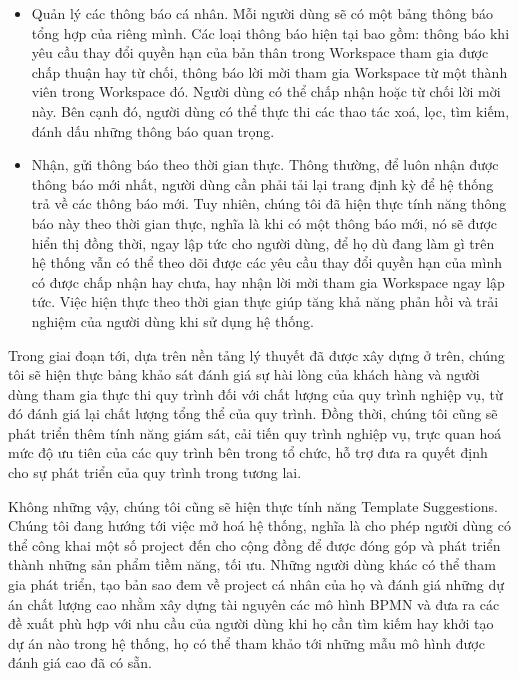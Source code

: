 \begin{itemize}
    \item Quản lý các thông báo cá nhân. Mỗi người dùng sẽ có một bảng thông báo tổng hợp
          của riêng mình. Các loại thông báo hiện tại bao gồm: thông báo khi yêu cầu thay đổi quyền hạn của bản thân trong
          Workspace tham gia được chấp thuận hay từ chối, thông báo lời mời tham gia
          Workspace từ một thành viên trong Workspace đó. Người dùng có thể chấp nhận
          hoặc từ chối lời mời này. Bên cạnh đó, người dùng có thể thực thi các thao tác
          xoá, lọc, tìm kiếm, đánh dấu những thông báo quan trọng.
    \item Nhận, gửi thông báo theo thời gian thực. Thông thường, để luôn nhận được thông
          báo mới nhất, người dùng cần phải tải lại trang định kỳ để hệ thống trả về các
          thông báo mới. Tuy nhiên, chúng tôi đã hiện thực tính năng thông báo này
          theo thời gian thực, nghĩa là khi có một thông báo mới, nó sẽ được hiển thị
          đồng thời, ngay lập tức cho người dùng, để họ dù đang làm gì trên hệ thống vẫn
          có thể theo dõi được các yêu cầu thay đổi quyền hạn của mình có được chấp nhận hay chưa, hay nhận
          lời mời tham gia Workspace ngay lập tức. Việc hiện thực theo thời gian thực
          giúp tăng khả năng phản hồi và trải nghiệm của người dùng khi sử dụng hệ thống.
\end{itemize}
\par
Trong giai đoạn tới, dựa trên nền tảng lý thuyết đã được xây dựng ở trên, chúng tôi
sẽ hiện thực bảng khảo sát đánh giá sự hài lòng của khách hàng và người dùng tham gia
thực thi quy trình đối với chất lượng của quy trình nghiệp vụ, từ đó đánh giá lại chất
lượng tổng thể của quy trình. Đồng thời, chúng tôi cũng sẽ phát triển thêm tính năng
giám sát, cải tiến quy trình nghiệp vụ, trực quan hoá mức độ ưu tiên của các quy trình
bên trong tổ chức, hỗ trợ đưa ra quyết định cho sự phát triển của quy trình trong tương lai.
\par
Không những vậy, chúng tôi cũng sẽ hiện thực tính năng Template Suggestions. 
Chúng tôi đang hướng tới việc mở hoá hệ thống, nghĩa là cho phép người dùng có thể 
công khai một số project đến cho cộng đồng để được đóng góp và phát triển thành 
những sản phẩm tiềm năng, tối ưu. Những người dùng khác có thể tham gia phát triển, 
tạo bản sao đem về project cá nhân của họ và đánh giá những dự án chất lượng cao 
nhằm xây dựng tài nguyên các mô hình BPMN và đưa ra các đề xuất phù hợp với nhu 
cầu của người dùng khi họ cần tìm kiếm hay khởi tạo dự án nào trong hệ thống, họ 
có thể tham khảo tới những mẫu mô hình được đánh giá cao đã có sẵn.
\newline

